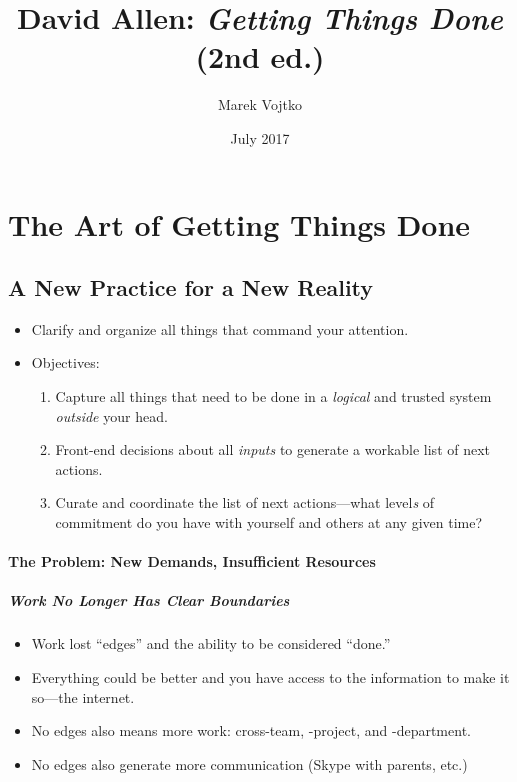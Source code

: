 \documentclass{article}
\title{David Allen: \textit{Getting Things Done} (2nd ed.)}
\author{Marek Vojtko}
\date{July 2017}
\begin{document}
\maketitle

\section{The Art of Getting Things Done}

\subsection{A New Practice for a New Reality}

\begin{itemize}
  \item Clarify and organize all things that command your attention.
  \item Objectives:
  \begin{enumerate}
    \item Capture all things that need to be done in a \emph{logical} and trusted system \emph{outside} your head.
    \item Front-end decisions about all \emph{inputs} to generate a workable list of next actions.
    \item Curate and coordinate the list of next actions---what level\emph{s} of commitment do you have with yourself and others at any given time?
  \end{enumerate}
\end{itemize}

\paragraph{The Problem: New Demands, Insufficient Resources}

\subparagraph{Work No Longer Has Clear Boundaries}

\begin{itemize}
  \item Work lost ``edges'' and the ability to be considered ``done.''
  \item Everything could be better and you have access to the information to make it so---the internet.
  \item No edges also means more work: cross-team, -project, and -department.
  \item No edges also generate more communication (Skype with parents, etc.)
\end{itemize}
\end{document}
